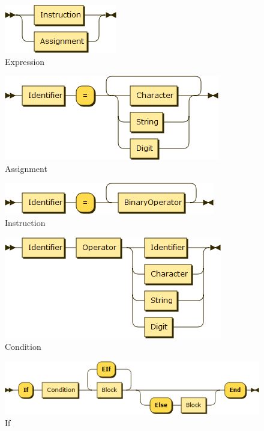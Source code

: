 \begin{figure}[h!]
\centering
\includegraphics[scale=0.5]{kepek/rr_expression.png}
\caption{Expression}
\label{fig:rr_expression}
\end{figure}

\begin{figure}[h!]
\centering
\includegraphics[scale=1]{kepek/rr_assignment.png}
\caption{Assignment}
\label{fig:rr_assignment}
\end{figure}

\begin{figure}[h!]
\centering
\includegraphics[scale=0.7]{kepek/rr_instruction.png}
\caption{Instruction}
\label{fig:rr_instruction}
\end{figure}

\begin{figure}[h!]
\centering
\includegraphics[scale=0.4]{kepek/rr_condition.png}
\caption{Condition}
\label{fig:rr_condition}
\end{figure}

\begin{figure}[h!]
\centering
\includegraphics[scale=0.4]{kepek/rr_if.png}
\caption{If}
\label{fig:rr_if}
\end{figure}

